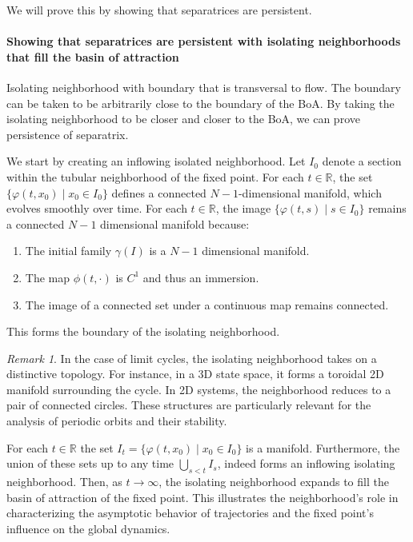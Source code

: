 \documentclass{article}
\theoremstyle{definition}
\theoremstyle{remark}
\newtheorem{remark}{Remark}
\newcommand{\reals}{\mathbb{R}}
\newcounter{ct}
\begin{document}
We will prove this by showing that separatrices are persistent.


\paragraph{Showing that separatrices are persistent with isolating neighborhoods that fill the basin of attraction}
Isolating neighborhood with boundary that is transversal to flow.
The boundary can be taken to be arbitrarily close to the boundary of the BoA.
By taking the isolating neighborhood to be closer and closer to the BoA, we can prove persistence of separatrix.

We start by creating an inflowing isolated neighborhood.
 Let $I_0$ denote a section within the tubular neighborhood of the fixed point.
For each $t\in\reals$, the set $\{\varphi(t,x_0) \mid x_0\in I_0\}$ defines a connected $N-1$-dimensional manifold, which evolves smoothly over time. 
For each \( t \in \reals \), the image \( \{ \varphi(t, s) \mid s \in I_0 \} \) remains a connected $N-1$ dimensional manifold because:
\begin{enumerate}
    \item The initial family \( \gamma(I) \) is a $N-1$ dimensional manifold.
    \item The map \( \phi(t, \cdot) \) is \( C^1 \) and thus an immersion.
    \item The image of a connected set under a continuous map remains connected.
\end{enumerate}
This forms the boundary of the isolating neighborhood.

\begin{remark}%
In the case of limit cycles, the isolating neighborhood takes on a distinctive topology. For instance, in a 3D state space, it forms a toroidal 2D manifold surrounding the cycle. In 2D systems, the neighborhood reduces to a pair of connected circles. These structures are particularly relevant for the analysis of periodic orbits and their stability.
 \end{remark}

For each $t\in\reals$ the set $I_t = \{\varphi(t,x_0) \mid x_0 \in I_0 \}$ is a manifold.
Furthermore, the union of these sets up to any time  $\bigcup_{s<t}I_s$, indeed forms an inflowing isolating neighborhood.
%
Then, as $t\rightarrow\infty$, the isolating neighborhood expands to fill the basin of attraction of the fixed point.
 This illustrates the neighborhood’s role in characterizing the asymptotic behavior of trajectories and the fixed point’s influence on the global dynamics.
\end{document}
